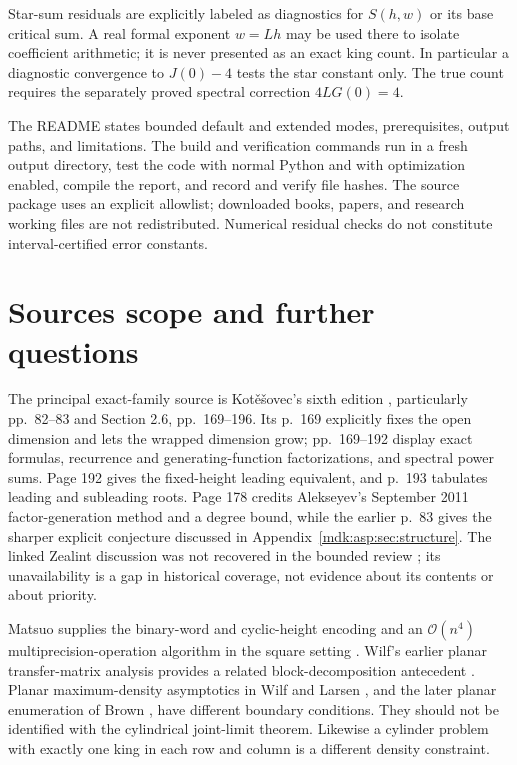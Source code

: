 \documentclass[11pt,letterpaper]{article}
\numberwithin{equation}{section}
\theoremstyle{remark}\newtheorem{remark}[theorem]{Remark}
\newcommand{\Oh}{\mathcal O}\newcommand{\Q}{\mathbb Q}\newcommand{\N}{\mathbb N}\newcommand{\R}{\mathbb R}
\begin{document}
Star-sum residuals are explicitly labeled as diagnostics for $S(h,w)$ or its base critical sum. A real formal exponent $w=Lh$ may be used there to isolate coefficient arithmetic; it is never presented as an exact king count. In particular a diagnostic convergence to $J(0)-4$ tests the star constant only. The true count requires the separately proved spectral correction $4LG(0)=4$.

The README states bounded default and extended modes, prerequisites, output paths, and limitations. The build and verification commands run in a fresh output directory, test the code with normal Python and with optimization enabled, compile the report, and record and verify file hashes. The source package uses an explicit allowlist; downloaded books, papers, and research working files are not redistributed. Numerical residual checks do not constitute interval-certified error constants.

\section{Sources scope and further questions}\label{mdk:asp:sec:sources}
The principal exact-family source is Kot\v{e}\v{s}ovec's sixth edition \cite{kotesovec}, particularly pp.~82--83 and Section 2.6, pp.~169--196. Its p.~169 explicitly fixes the open dimension and lets the wrapped dimension grow; pp.~169--192 display exact formulas, recurrence and generating-function factorizations, and spectral power sums. Page 192 gives the fixed-height leading equivalent, and p.~193 tabulates leading and subleading roots. Page 178 credits Alekseyev's September 2011 factor-generation method and a degree bound, while the earlier p.~83 gives the sharper explicit conjecture discussed in Appendix~\ref{mdk:asp:sec:structure}. The linked Zealint discussion was not recovered in the bounded review \cite{zealint}; its unavailability is a gap in historical coverage, not evidence about its contents or about priority.

Matsuo supplies the binary-word and cyclic-height encoding and an $\Oh(n^4)$ multiprecision-operation algorithm in the square setting \cite{matsuo}. Wilf's earlier planar transfer-matrix analysis provides a related block-decomposition antecedent \cite{wilf}. Planar maximum-density asymptotics in Wilf and Larsen \cite{wilf,larsen}, and the later planar enumeration of Brown \cite{brown}, have different boundary conditions. They should not be identified with the cylindrical joint-limit theorem. Likewise a cylinder problem with exactly one king in each row and column is a different density constraint.
\end{document}
